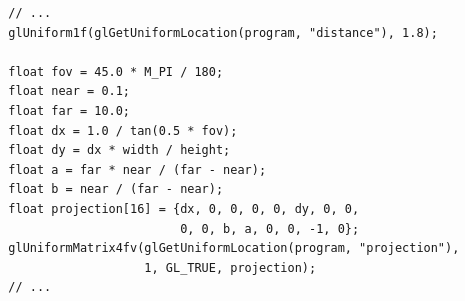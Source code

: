 \documentclass[calcdimensions,landscape,letterpaper]{powersem}
\newcommand{\thecurrentheading}{}
\newcommand{\heading}[1]{\renewcommand{\thecurrentheading}{#1}}
\begin{document}
\begin{slide}
    \heading{3D: Uniform Distance and Projection Matrix}
    \begin{center}
        \begin{minipage}[c]{.95\textwidth}
            \begin{verbatim}
  // ...
  glUniform1f(glGetUniformLocation(program, "distance"), 1.8);

  float fov = 45.0 * M_PI / 180;
  float near = 0.1;
  float far = 10.0;
  float dx = 1.0 / tan(0.5 * fov);
  float dy = dx * width / height;
  float a = far * near / (far - near);
  float b = near / (far - near);
  float projection[16] = {dx, 0, 0, 0, 0, dy, 0, 0,
                          0, 0, b, a, 0, 0, -1, 0};
  glUniformMatrix4fv(glGetUniformLocation(program, "projection"),
                     1, GL_TRUE, projection);
  // ...
            \end{verbatim}
        \end{minipage}
    \end{center}
\end{slide}

\begin{slide}
    \heading{3D: Projected Quad}
    \begin{center}
    \end{center}
\end{slide}
\end{document}
